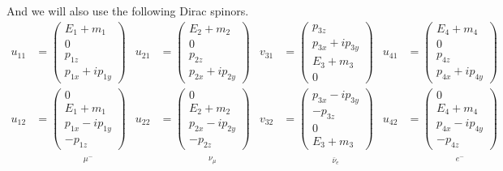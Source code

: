 \documentclass[12pt]{article}
\begin{document}
\noindent
And we will also use the following Dirac spinors.
\begin{align*}
u_{11}&=\begin{pmatrix}E_1+m_1\\0\\p_{1z}\\p_{1x}+ip_{1y}\end{pmatrix}
&
u_{21}&=\begin{pmatrix}E_2+m_2\\0\\p_{2z}\\p_{2x}+ip_{2y}\end{pmatrix}
&
v_{31}&=\begin{pmatrix}p_{3z}\\p_{3x}+ip_{3y}\\E_3+m_3\\0\end{pmatrix}
&
u_{41}&=\begin{pmatrix}E_4+m_4\\0\\p_{4z}\\p_{4x}+ip_{4y}\end{pmatrix}
\\[2ex]
u_{12}&=
\underset{\substack{\\[1ex] \mu^-}}
{\begin{pmatrix}0\\E_1+m_1\\p_{1x}-ip_{1y}\\-p_{1z}\end{pmatrix}}
&
u_{22}&=
\underset{\substack{\\[1ex] \nu_\mu}}
{\begin{pmatrix}0\\E_2+m_2\\p_{2x}-ip_{2y}\\-p_{2z}\end{pmatrix}}
&
v_{32}&=
\underset{\substack{\\[1ex] \bar{\nu}_e}}
{\begin{pmatrix}p_{3x}-ip_{3y}\\-p_{3z}\\0\\E_3+m_3\end{pmatrix}}
&
u_{42}&=
\underset{\substack{\\[1ex] e^-}}
{\begin{pmatrix}0\\E_4+m_4\\p_{4x}-ip_{4y}\\-p_{4z}\end{pmatrix}}
\end{align*}
\end{document}
